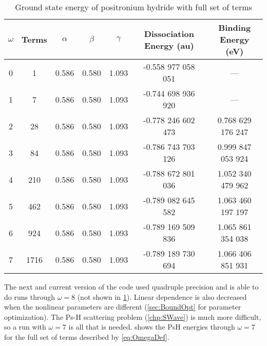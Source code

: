 \documentclass[Dissertation.tex]{subfiles}
\begin{document}
\setlength{\abovecaptionskip}{6pt}   %
\setlength{\belowcaptionskip}{6pt}   %
\begin{table}[H]
\centering
\begin{tabular}{c c c c c c c}
\toprule
$\omega$ & Terms & $\alpha$ & $\beta$ & $\gamma$ & Dissociation Energy (au) & Binding Energy (eV) \\ [0.5ex]
\midrule
0 & 1 & 0.586 & 0.580 & 1.093 & -0.558 977 058 051 & --- \\
1 & 7 & 0.586 & 0.580 & 1.093 & -0.744 698 936 920 & --- \\
2 & 28 & 0.586 & 0.580 & 1.093 & -0.778 246 602 473 & 0.768 629 176 247 \\
3 & 84 & 0.586 & 0.580 & 1.093 & -0.786 743 703 126 & 0.999 847 053 924 \\
4 & 210 & 0.586 & 0.580 & 1.093 & -0.788 672 801 036 & 1.052 340 479 962 \\
5 & 462 & 0.586 & 0.580 & 1.093 & -0.789 082 645 582 & 1.063 460 197 197 \\
6 & 924 & 0.586 & 0.580 & 1.093 & -0.789 169 509 836 & 1.065 861 354 038 \\
7 & 1716 & 0.586 & 0.580 & 1.093 & -0.789 189 730 694 & 1.066 406 851 931 \\
\bottomrule
\end{tabular}
\caption{Ground state energy of positronium hydride with full set of terms} %
\label{tab:BoundEnergy1}
\end{table}

The next and current version of the code used quadruple precision and is able to do runs through $\omega = 8$ (not shown in \cref{tab:BoundEnergy1}). Linear dependence is also decreased when the nonlinear parameters are different (\cref{sec:BoundOpt} for parameter optimization). The Ps-H scattering problem (\cref{chp:SWave}) is much more difficult, so a run with $\omega = 7$ is all that is needed.  shows the PsH energies through $\omega = 7$ for the full set of terms described by \cref{eq:OmegaDef}.
\end{document}
